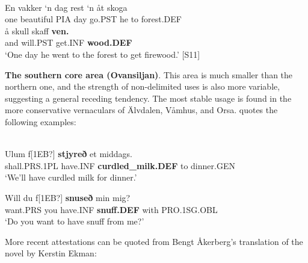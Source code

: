 
\ea \label{} 
\\
\gll En  vakker  ‘n  dag  rest  ‘n  åt  skoga\\
one  beautiful  PIA  day  go.PST  he  to  forest.DEF\\
\gll å  skull  skaff  \textbf{ven.}\\
and  will.PST  get.INF  \textbf{wood.DEF}\\
\glt ‘One day he went to the forest to get firewood.’ [S11]

\z

\textbf{The southern core area (Ovansiljan)}. This area is much smaller than the northern one, and the strength of non-delimited uses is also more variable, suggesting a general receding tendency. The most stable usage is found in the more conservative vernaculars of Älvdalen, Våmhus, and Orsa. \citet[95]{Levander1909} quotes the following examples:


\ea\label{}
\\
\gll Ulum  f[1EB?]  \textbf{stjyreð} et  middags.  \\
shall.PRS.1PL  have.INF  \textbf{curdled\_milk.DEF} to  dinner.GEN\footnotemark{} \\
\glt ‘We’ll have curdled milk for dinner.’

\z
{} 
\ea
\gll Will  du  f[1EB?]  \textbf{snuseð} min  mig?\\
want.PRS  you  have.INF  \textbf{snuff.DEF} with  PRO.1SG.OBL\\
\glt  ‘Do you want to have snuff from me?’

\z

More recent attestations can be quoted from Bengt Åkerberg’s translation of the novel  by Kerstin Ekman:


\ea\label{}
\\
	\z
\z 
	
